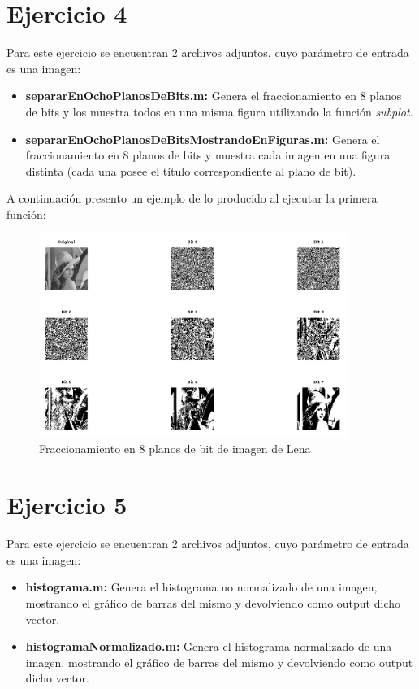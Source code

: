 \documentclass{article}
\begin{document}
\section*{Ejercicio 4}
Para este ejercicio se encuentran 2 archivos adjuntos, cuyo parámetro de entrada es una imagen:
\begin{itemize}
\item \textbf{separarEnOchoPlanosDeBits.m: }Genera el fraccionamiento en 8 planos de bits y los muestra todos en una misma figura utilizando la función \textit{subplot}.
\item \textbf{separarEnOchoPlanosDeBitsMostrandoEnFiguras.m: }Genera el fraccionamiento en 8 planos de bits y muestra cada imagen en una figura distinta (cada una posee el título correspondiente al plano de bit).
\end{itemize}

A continuación presento un ejemplo de lo producido al ejecutar la primera función:

\begin{figure}[H]
   \includegraphics[width=0.9\textwidth]{planobitslena.png} %
    \caption{Fraccionamiento en 8 planos de bit de imagen de Lena}
\end{figure}

\section*{Ejercicio 5}
Para este ejercicio se encuentran 2 archivos adjuntos, cuyo parámetro de entrada es una imagen:
\begin{itemize}
\item \textbf{histograma.m: }Genera el histograma no normalizado de una imagen, mostrando el gráfico de barras del mismo y devolviendo como output dicho vector.
\item \textbf{histogramaNormalizado.m: } Genera el histograma normalizado de una imagen, mostrando el gráfico de barras del mismo y devolviendo como output dicho vector.
\end{itemize}
\end{document}
